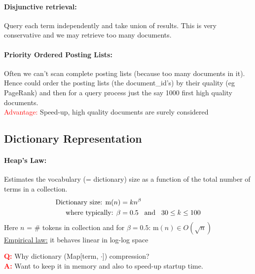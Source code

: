 \documentclass[a4paper,11pt]{article}
\begin{document}
\begin{multicols}{2}
\paragraph{Disjunctive retrieval:} Query each term independently and take union of results. This is very conservative and we may retrieve too many documents.

\paragraph{Priority Ordered Posting Lists:} Often we can't scan complete posting lists (because too many documents in it). Hence could order the posting lists (the document\_id's) by their quality (eg PageRank) and then for a query process just the say 1000 first high quality documents. \\
\textcolor{red}{Advantage:} Speed-up, high quality documents are surely considered

\subsection{Dictionary Representation}
\paragraph{Heap's Law:} Estimates the vocabulary (= dictionary) size as a function of the total number of terms in a collection.
\begin{align*}
  \text{Dictionary size: } \text m(n) &= kn^{\beta} \\
  \text{where typically: } \beta &= 0.5 \hspace{0.3cm} \text{and} \hspace{0.3cm}30 \leq k \leq 100
\end{align*}
Here $n$ = \# tokens in collection and for $\beta = 0.5$: m$(n) \in O(\sqrt{n})$\\
\underline{Empirical law:} it behaves linear in log-log space

\textcolor{red}{\textbf{Q:}} Why dictionary (Map[term, $\cdot$]) compression? \\
\textcolor{red}{\textbf{A:}} Want to keep it in memory and also to speed-up startup time.


\end{multicols}
\end{document}
